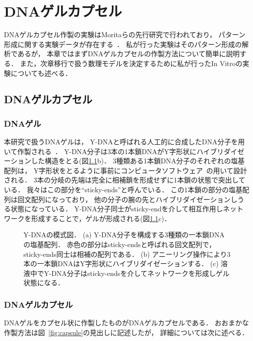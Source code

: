 \chapter{DNAゲルカプセル}
\label{sec:dnagel}

DNAゲルカプセル作製の実験はMoritaらの先行研究で行われており，
パターン形成に関する実験データが存在する~\cite{moritasan}．
私が行った実験はそのパターン形成の解析であるが，
本章ではまずDNAゲルカプセルの作製方法について簡単に説明する．
また，次章移行で扱う数理モデルを決定するために私が行ったIn Vitroの実験についても述べる．

\section{DNAゲルカプセル}

\subsection{DNAゲル}

本研究で扱うDNAゲルは，
Y-DNAと呼ばれる人工的に合成したDNA分子を用いて作製される~\cite{morita2017formation}．
Y-DNA分子は3本の1本鎖DNAがY字形状にハイブリダイゼーションした構造をとる(図\ref{fig:ydna}b)．
3種類ある1本鎖DNA分子のそれぞれの塩基配列は，
Y字形状をとるように事前にコンピュータソフトウェア~\cite{zadeh2011nupack}の用いて設計される．
3本の分岐の先端は完全に相補鎖を形成せずに1本鎖の状態で突出している．
我々はこの部分を``sticky-ends''と呼んでいる．
この1本鎖の部分の塩基配列は回文配列になっており，
他の分子の腕の先とハイブリダイゼーションしうる状態になっている．
Y-DNA分子同士がsticky-endを介して相互作用しネットワークを形成することで，ゲルが形成される(図\ref{fig:ydna}c)．

\begin{figure}
\centering

\caption{Y-DNAの模式図．
    (a) Y-DNA分子を構成する3種類の一本鎖DNAの塩基配列．
        赤色の部分はsticky-endsと呼ばれる回文配列で，sticky-ends同士は相補の配列である．
    (b) アニーリング操作により3本の一本鎖DNAはY字形状にハイブリダイゼーションする．
    (c) 溶液中でY-DNA分子はsticky-endsを介してネットワークを形成しゲル状態になる．
}

\label{fig:ydna}
\end{figure}

\subsection{DNAゲルカプセル}

DNAゲルをカプセル状に作製したものがDNAゲルカプセルである．
おおまかな作製方法は図~\ref{fig:capsule}の見出しに記述したが，
詳細については次に述べる．

